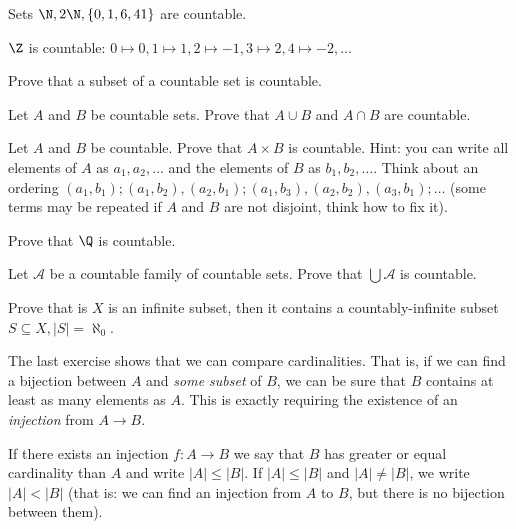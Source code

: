 \begin{example}
  Sets $\N, 2\N, \{0,1,6, 41\}$ are countable.
\end{example}

\begin{example}
  $\Z$ is countable: $0\mapsto 0, 1\mapsto 1, 2\mapsto -1, 3\mapsto 2, 4\mapsto -2,\dots$
\end{example}

\begin{exercise}
  Prove that a subset of a countable set is countable.
\end{exercise}

\begin{exercise}
  Let $A$ and $B$ be countable sets. Prove that $A\cup B$ and $A\cap B$ are countable.
\end{exercise}

\begin{exercise}
  Let $A$ and $B$ be countable. Prove that $A\times B$ is countable. Hint: you can write all elements of $A$ as $a_1,a_2,\dots$ and the elements of $B$ as $b_1, b_2,\dots$.
  Think about an ordering $(a_1,b_1); (a_1, b_2), (a_2, b_1); (a_1, b_3), (a_2, b_2), (a_3, b_1); \dots$ (some terms may be repeated if $A$ and $B$ are not disjoint, think how to fix it).
\end{exercise}

\begin{exercise}
  Prove that $\Q$ is countable.
\end{exercise}

\begin{exercise}
  Let $\mathcal A$ be a countable family of countable sets. Prove that $\bigcup \mathcal A$ is countable.
\end{exercise}

\begin{exercise}
  Prove that is $X$ is an infinite subset, then it contains a countably-infinite subset $S\subseteq X, |S|=\aleph_0$.
\end{exercise}

The last exercise shows that we can compare cardinalities. That is, if we can find a bijection between $A$ and \textit{some subset} of $B$, we can be sure that $B$ contains at least
as many elements as $A$. This is exactly requiring the existence of an \textit{injection} from $A\to B$.

\begin{definition}
  If there exists an injection $f:A\to B$ we say that $B$ has greater or equal cardinality than $A$ and write $|A|\le |B|$. If $|A|\le |B|$ and $|A|\neq |B|$, we write
  $|A| < |B|$ (that is: we can find an injection from $A$ to $B$, but there is no bijection between them).
\end{definition}

